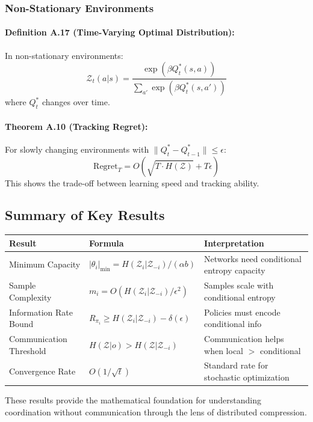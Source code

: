 \documentclass[10pt, letterpaper]{article}
\begin{document}
\subsubsection{Non-Stationary Environments}

\paragraph{Definition A.17 (Time-Varying Optimal Distribution):} In non-stationary environments:
\[\mathcal{Z}_t(a|s) = \frac{\exp(\beta Q^*_t(s,a))}{\sum_{a'} \exp(\beta Q^*_t(s,a'))}\]
where $Q^*_t$ changes over time.

\paragraph{Theorem A.10 (Tracking Regret):} For slowly changing environments with $\|Q^*_t - Q^*_{t-1}\| \leq \epsilon$:
\[\text{Regret}_T = O(\sqrt{T \cdot H(\mathcal{Z})} + T\epsilon)\]
This shows the trade-off between learning speed and tracking ability.

\subsection{Summary of Key Results}

\begin{center}
\small
\begin{tabular}{lll}
\toprule
\textbf{Result} & \textbf{Formula} & \textbf{Interpretation} \\
\midrule
Minimum Capacity & $|\theta_i|_{\min} = H(\mathcal{Z}_i|\mathcal{Z}_{-i})/(\alpha b)$ & Networks need conditional entropy capacity \\
Sample Complexity & $m_i = O(H(\mathcal{Z}_i|\mathcal{Z}_{-i})/\epsilon^2)$ & Samples scale with conditional entropy \\
Information Rate Bound & $R_{\pi_i} \geq H(\mathcal{Z}_i|\mathcal{Z}_{-i}) - \delta(\epsilon)$ & Policies must encode conditional info \\
Communication Threshold & $H(\mathcal{Z}|o) > H(\mathcal{Z}|\mathcal{Z}_{-i})$ & Communication helps when local $>$ conditional \\
Convergence Rate & $O(1/\sqrt{t})$ & Standard rate for stochastic optimization \\
\bottomrule
\end{tabular}
\end{center}

These results provide the mathematical foundation for understanding coordination without communication through the lens of distributed compression.
\end{document}

